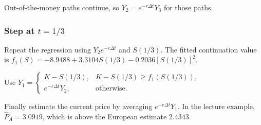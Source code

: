 Out-of-the-money paths continue, so $Y_2=e^{-r\Delta t}Y_3$ for those paths.

\subsubsection*{Step at $t=1/3$}

Repeat the regression using $Y_2e^{-r\Delta t}$ and $S(1/3)$. The fitted continuation value is
$f_1(S)=-8.9488+3.3104S(1/3)-0.2036[S(1/3)]^2$.

Use
$Y_1=\begin{cases}K-S(1/3),&K-S(1/3)\ge f_1(S(1/3)),\\ e^{-r\Delta t}Y_2,&\text{otherwise}.\end{cases}$

Finally estimate the current price by averaging $e^{-r\Delta t}Y_1$. In the lecture example, $\hat P_A=3.0919$, which is above the European estimate $2.4343$.
